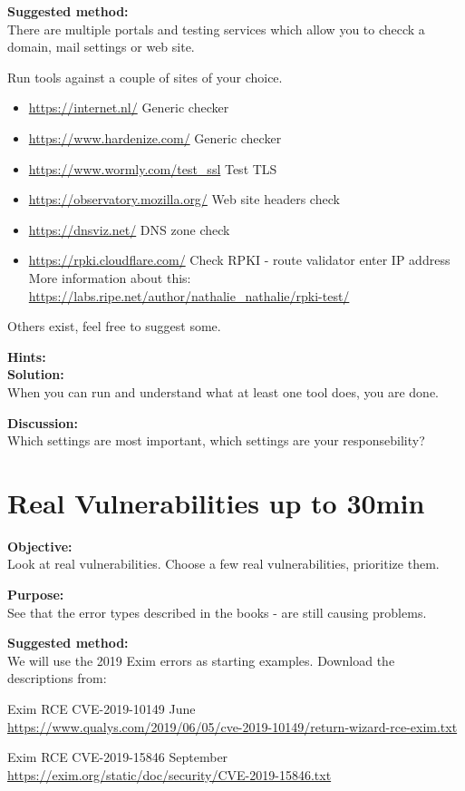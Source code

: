 \documentclass[a4paper,11pt,notitlepage]{report}
\begin{document}
{\bf Suggested method:}\\
There are multiple portals and testing services which allow you to checck a domain,
mail settings or web site.

Run tools against a couple of sites of your choice.
\begin{itemize}
\item \url{https://internet.nl/} Generic checker
\item \url{https://www.hardenize.com/} Generic checker
\item \url{https://www.wormly.com/test_ssl} Test TLS
\item \url{https://observatory.mozilla.org/} Web site headers check
\item \url{https://dnsviz.net/} DNS zone check
\item \url{https://rpki.cloudflare.com/} Check RPKI - route validator enter
IP address\\
More information about this: \url{https://labs.ripe.net/author/nathalie_nathalie/rpki-test/}
\end{itemize}

Others exist, feel free to suggest some.

{\bf Hints:}\\

{\bf Solution:}\\
When you can run and understand what at least one tool does, you are done.

{\bf Discussion:}\\
Which settings are most important, which settings are your responsebility?



\chapter{Real Vulnerabilities up to 30min}
\label{ex:real-vulns-exim}

{\bf Objective:}\\
Look at real vulnerabilities. Choose a few real vulnerabilities, prioritize them.

{\bf Purpose:}\\
See that the error types described in the books - are still causing problems.

{\bf Suggested method:}\\
We will use the 2019 Exim errors as starting examples. Download the descriptions from:
\begin{list2}
\item Exim RCE CVE-2019-10149 June\\ \url{https://www.qualys.com/2019/06/05/cve-2019-10149/return-wizard-rce-exim.txt}

\item Exim RCE CVE-2019-15846 September\\
\url{https://exim.org/static/doc/security/CVE-2019-15846.txt}
\end{list2}
\end{document}
